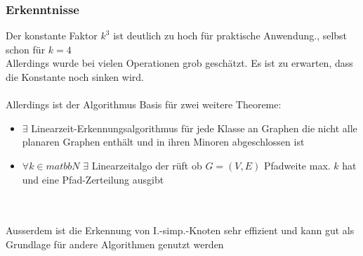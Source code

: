 \begin{frame}
\frametitle{Erkenntnisse}

Der konstante Faktor $k^3$ ist deutlich zu hoch für praktische Anwendung., selbst schon für $k=4$ \\
Allerdings wurde bei vielen Operationen grob geschätzt. Es ist zu erwarten, dass die Konstante noch sinken wird. \\
\ \\
Allerdings ist der Algorithmus Basis für zwei weitere Theoreme: \\
\begin{itemize}
	\item $\exists$ Linearzeit-Erkennungsalgorithmus für jede Klasse an Graphen die nicht alle planaren Graphen enthält und in ihren Minoren abgeschlossen ist
	\item $\forall k \in matbb{N}$ $\exists$ Linearzeitalgo der rüft ob $G=(V,E)$ Pfadweite max. $k$ hat und eine Pfad-Zerteilung ausgibt
\end{itemize}
\ \\
\ \\
Ausserdem ist die Erkennung von I.-simp.-Knoten sehr effizient und kann gut als Grundlage für andere Algorithmen genutzt werden



\end{frame}
